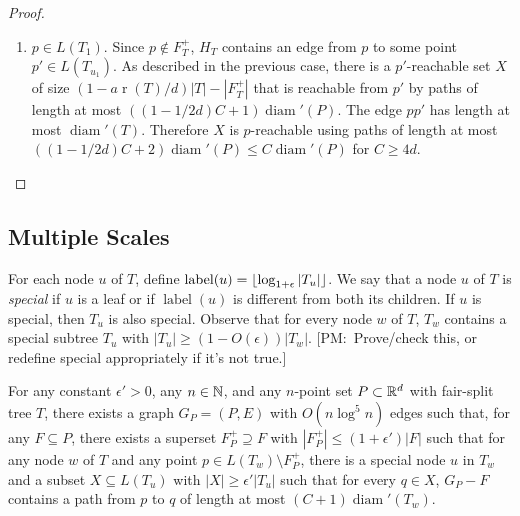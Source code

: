 \documentclass{patmorin}
\newcommand{\note}[2]{{\color{red}[#1:~#2]}}
\DeclareMathOperator{\rank}{r}
\DeclareMathOperator{\diam}{diam}
\DeclareMathOperator{\lbl}{label}
\begin{document}
\begin{proof}
\begin{enumerate}
\begin{enumerate}
	    \item $p\in L(T_1)$. Since $p\not\in F^+_T$, $H_T$ contains an
	    edge from $p$ to some point $p'\in L(T_{u_1})$.  As described
	    in the previous case, there is a $p'$-reachable set $X$ of
	    size $(1-a\rank(T)/d)|T|-|F^+_T|$ that is reachable from $p'$
	    by paths of length at most $((1-1/2d)C+1)\diam'(P)$.
	    The edge $pp'$ has length at most
	    $\diam'(T)$. Therefore $X$ is $p$-reachable using
	    paths of length at most $((1-1/2d)C+2)\diam'(P)
	    \le C\diam'(P)$ for $C\ge 4d$.
    \end{enumerate}
  \end{enumerate}
\end{proof}

\subsection{Multiple Scales}

For each node $u$ of $T$, define
$\lbl(u)=\floor{\log_{1+\epsilon}|T_u|}$. We say that a node $u$ of $T$
is \emph{special} if $u$ is a leaf or if $\lbl(u)$ is different from
both its children.  If $u$ is special, then $T_u$ is also special.  Observe that for every node $w$ of $T$, $T_w$
contains a special subtree $T_u$ with $|T_u|\ge (1-O(\epsilon))|T_w|$.
\note{PM}{Prove/check this, or redefine special appropriately if it's not
true.}

\begin{lem}
  For any constant $\epsilon' >0$, any $n\in\mathbb{N}$, and any $n$-point
  set $P\subset\mathbb{R}^d$ with fair-split tree $T$, there exists a graph
  $G_P=(P,E)$ with $O(n\log^5 n)$ edges such that, for any $F\subseteq
  P$, there exists a superset $F^+_P\supseteq F$ with $|F^+_P|\le
  (1+\epsilon')|F|$ such that for any node $w$ of $T$ and any point
  $p\in L(T_w)\setminus F^+_P$, there is a special node $u$ in $T_w$
  and a subset $X\subseteq L(T_u)$
  with $|X|\ge \epsilon'|T_u|$ such that for every $q\in X$, $G_P-F$
  contains a path from $p$ to $q$ of length at most $(C+1)\diam'(T_w)$.
\end{lem}
\end{document}
